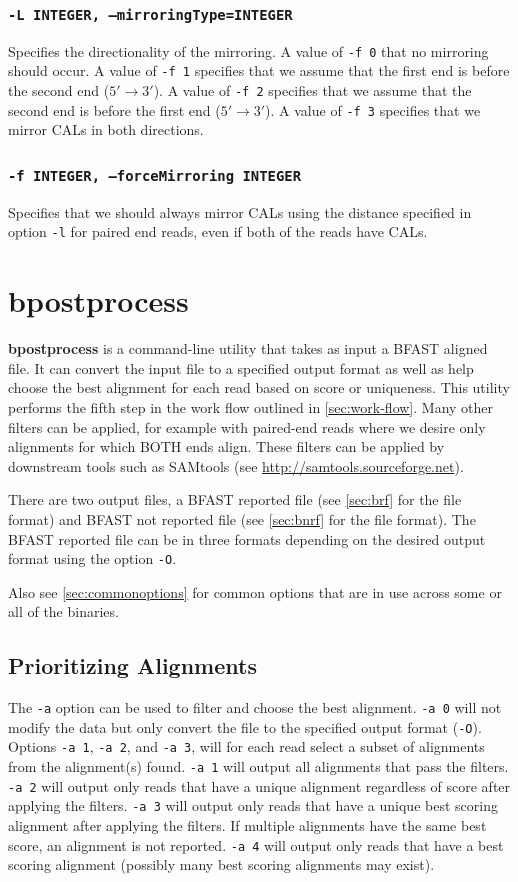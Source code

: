 \documentclass[a4paper,12pt]{book}
\newcommand{\TT}[1]{{\tt #1}} %
\newcommand{\BF}[1]{{\bf #1}} %
\newcommand{\BAF}{BFAST aligned file} %
\newcommand{\BRF}{BFAST reported file} %
\newcommand{\BNRF}{BFAST not reported file} %
\begin{document}
\subsubsection{\TT{-L INTEGER, --mirroringType=INTEGER}}
Specifies the directionality of the mirroring.
A value of \TT{-f 0} that no mirroring should occur.
A value of \TT{-f 1} specifies that we assume that the first end is before the second end ($5'\rightarrow3'$).
A value of \TT{-f 2} specifies that we assume that the second end is before the first end ($5'\rightarrow3'$).
A value of \TT{-f 3} specifies that we mirror CALs in both directions.
\subsubsection{\TT{-f INTEGER, --forceMirroring INTEGER}}
Specifies that we should always mirror CALs using the distance specified in option \TT{-l} for paired end reads, even if both of the reads have CALs.

\section{bpostprocess}
\label{sec:bpostprocess}
\BF{bpostprocess} is a command-line utility that takes as input a \BAF{}.
It can convert the input file to a specified output format as well as help choose the best alignment for each read based on score or uniqueness.
This utility performs the fifth step in the work flow outlined in \autoref{sec:work-flow}.
Many other filters can be applied, for example with paired-end reads where we desire only alignments for which BOTH ends align. 
These filters can be applied by downstream tools such as SAMtools (see \url{http://samtools.sourceforge.net}).

There are two output files, a \BRF{} (see \autoref{sec:brf} for the file format) and \BNRF{} (see \autoref{sec:bnrf} for the file format).
The \BRF{} can be in three formats depending on the desired output format using the option \TT{-O}.

Also see \autoref{sec:commonoptions} for common options that are in use across some or all of the binaries.

\subsection{Prioritizing Alignments}
\label{sec:prioritizing-alignments}

The \TT{-a} option can be used to filter and choose the best alignment.
\TT{-a 0} will not modify the data but only convert the file to the specified output format (\TT{-O}).
Options \TT{-a 1}, \TT{-a 2}, and \TT{-a 3}, will for each read select a subset of alignments from the alignment(s) found.
\TT{-a 1} will output all alignments that pass the filters.
\TT{-a 2} will output only reads that have a unique alignment regardless of score after applying the filters.
\TT{-a 3} will output only reads that have a unique best scoring alignment after applying the filters.
If multiple alignments have the same best score, an alignment is not reported.
\TT{-a 4} will output only reads that have a best scoring alignment (possibly many best scoring alignments may exist).
\end{document}
